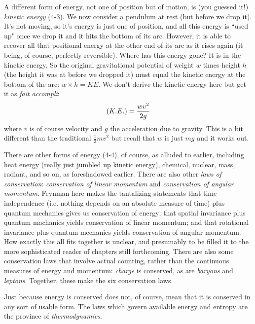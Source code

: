 \documentclass[10pt,letterpaper]{article}
\begin{document}
\indent A different form of energy, not one of position but of motion, is (you guessed it!) \textit{kinetic energy} (4-3). We now consider a pendulum at rest (but before we drop it). It's not moving, so it's energy is just one of position, and all this energy is ``used up" once we drop it and it hits the bottom of its arc. However, it is able to recover all that positional energy at the other end of its arc as it rises again (it being, of course, perfectly reversible). Where has this energy gone? It is in the kinetic energy. So the original gravitational potential of weight $w$ times height $h$ (the height it was at before we dropped it) must equal the kinetic energy at the bottom of the arc: $w \times h = KE$. We don't derive the kinetic energy here but get it as \textit{fait accompli}:
$$
\textrm(K.E.) = \frac{wv^2}{2g}
$$
where $v$ is of course velocity and $g$ the acceleration due to gravity. This is a bit different than the traditional $\frac{1}{2}mv^2$ but recall that $w$ is just $mg$ and it works out. 

\indent There are other forms of energy (4-4), of course, as alluded to earlier, including heat energy (really just jumbled up kinetic energy), chemical, nuclear, mass, radiant, and so on, as foreshadowed earlier. There are also other \textit{laws of conservation}: \textit{conservation of linear momentum} and \textit{conservation of angular momentum}. Feynman here makes the tantalizing statements that time independence (i.e. nothing depends on an absolute measure of time) plus quantum mechanics gives us conservation of energy; that spatial invariance plus quantum machanics yields conservation of linear momentum; and that rotational invariance plus quantum mechanics yields conservation of angular momentum. How exactly this all fits together is unclear, and presumably to be filled it to the more sophisticated reader of chapters still forthcoming.
\indent There are also some conservation laws that involve actual counting, rather than the continuous measures of energy and momentum: \textit{charge} is conserved, as are \textit{baryons} and \textit{leptons}. Together, these make the six conservation laws. 

\indent Just because energy is conserved does not, of course, mean that it is conserved in any sort of usable form. The laws which govern available energy and entropy are the province of \textit{thermodynamics}. 
\end{document}
